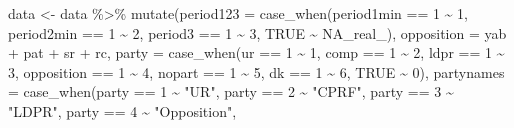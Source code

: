 \documentclass[
  letterpaper,
  DIV=11,
  numbers=noendperiod]{scrartcl}
\newenvironment{Shaded}{\begin{snugshade}}{\end{snugshade}}
\newcommand{\AttributeTok}[1]{\textcolor[rgb]{0.40,0.45,0.13}{#1}}
\newcommand{\ConstantTok}[1]{\textcolor[rgb]{0.56,0.35,0.01}{#1}}
\newcommand{\DecValTok}[1]{\textcolor[rgb]{0.68,0.00,0.00}{#1}}
\newcommand{\FunctionTok}[1]{\textcolor[rgb]{0.28,0.35,0.67}{#1}}
\newcommand{\NormalTok}[1]{\textcolor[rgb]{0.00,0.23,0.31}{#1}}
\newcommand{\OtherTok}[1]{\textcolor[rgb]{0.00,0.23,0.31}{#1}}
\newcommand{\SpecialCharTok}[1]{\textcolor[rgb]{0.37,0.37,0.37}{#1}}
\newcommand{\StringTok}[1]{\textcolor[rgb]{0.13,0.47,0.30}{#1}}
\begin{document}
\begin{Shaded}
\begin{Highlighting}[]
\NormalTok{data }\OtherTok{\textless{}{-}}\NormalTok{ data }\SpecialCharTok{\%\textgreater{}\%} 
  \FunctionTok{mutate}\NormalTok{(}\AttributeTok{period123 =} \FunctionTok{case\_when}\NormalTok{(period1min }\SpecialCharTok{==} \DecValTok{1} \SpecialCharTok{\textasciitilde{}} \DecValTok{1}\NormalTok{,}
\NormalTok{                               period2min }\SpecialCharTok{==} \DecValTok{1} \SpecialCharTok{\textasciitilde{}} \DecValTok{2}\NormalTok{,}
\NormalTok{                               period3 }\SpecialCharTok{==} \DecValTok{1} \SpecialCharTok{\textasciitilde{}} \DecValTok{3}\NormalTok{,}
                               \ConstantTok{TRUE} \SpecialCharTok{\textasciitilde{}} \ConstantTok{NA\_real\_}\NormalTok{),}
         \AttributeTok{opposition =}\NormalTok{ yab }\SpecialCharTok{+}\NormalTok{ pat }\SpecialCharTok{+}\NormalTok{ sr }\SpecialCharTok{+}\NormalTok{ rc,}
         \AttributeTok{party =} \FunctionTok{case\_when}\NormalTok{(ur }\SpecialCharTok{==} \DecValTok{1} \SpecialCharTok{\textasciitilde{}} \DecValTok{1}\NormalTok{,}
\NormalTok{                           comp }\SpecialCharTok{==} \DecValTok{1} \SpecialCharTok{\textasciitilde{}} \DecValTok{2}\NormalTok{,}
\NormalTok{                           ldpr }\SpecialCharTok{==} \DecValTok{1} \SpecialCharTok{\textasciitilde{}} \DecValTok{3}\NormalTok{,}
\NormalTok{                           opposition }\SpecialCharTok{==} \DecValTok{1} \SpecialCharTok{\textasciitilde{}} \DecValTok{4}\NormalTok{,}
\NormalTok{                           nopart }\SpecialCharTok{==} \DecValTok{1} \SpecialCharTok{\textasciitilde{}} \DecValTok{5}\NormalTok{,}
\NormalTok{                           dk }\SpecialCharTok{==} \DecValTok{1} \SpecialCharTok{\textasciitilde{}} \DecValTok{6}\NormalTok{,}
                           \ConstantTok{TRUE} \SpecialCharTok{\textasciitilde{}} \DecValTok{0}\NormalTok{),}
         \AttributeTok{partynames =} \FunctionTok{case\_when}\NormalTok{(party }\SpecialCharTok{==} \DecValTok{1} \SpecialCharTok{\textasciitilde{}} \StringTok{"UR"}\NormalTok{,}
\NormalTok{                                party }\SpecialCharTok{==} \DecValTok{2} \SpecialCharTok{\textasciitilde{}} \StringTok{"CPRF"}\NormalTok{,}
\NormalTok{                                party }\SpecialCharTok{==} \DecValTok{3} \SpecialCharTok{\textasciitilde{}} \StringTok{"LDPR"}\NormalTok{,}
\NormalTok{                                party }\SpecialCharTok{==} \DecValTok{4} \SpecialCharTok{\textasciitilde{}} \StringTok{"Opposition"}\NormalTok{,}

\end{Highlighting}
\end{Shaded}
\end{document}

